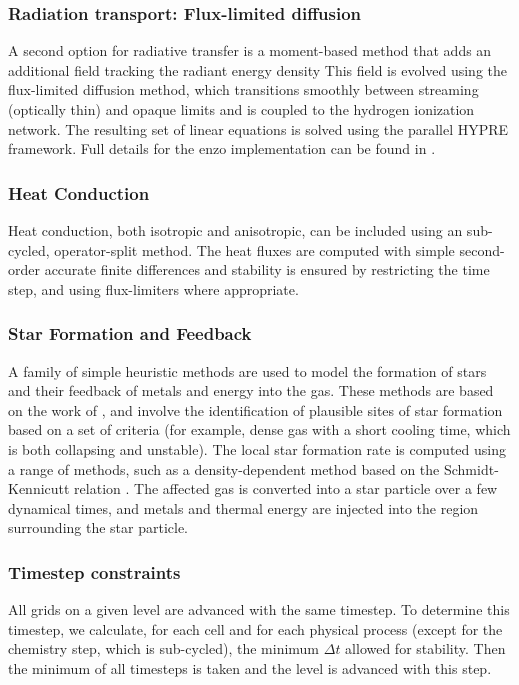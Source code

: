 \subsubsection{Radiation transport: Flux-limited diffusion}

A second option for radiative transfer is a moment-based method that
adds an additional field tracking the radiant energy density
This field is evolved using the flux-limited diffusion method, which
transitions smoothly between streaming (optically thin) and opaque
limits and is coupled to the hydrogen ionization network.  The
resulting set of linear equations is solved using the parallel HYPRE
framework.  Full details for the enzo implementation can be found in
\citet{ReynoldsHayesPaschosNorman2009}.

\subsubsection{Heat Conduction}

Heat conduction, both isotropic and anisotropic, can be included using
an sub-cycled, operator-split method.  The heat fluxes are computed
with simple second-order accurate finite differences and stability is
ensured by restricting the time step, and using flux-limiters where
appropriate.

\subsubsection{Star Formation and Feedback}

A family of simple heuristic methods are used to model the formation
of stars and their feedback of metals and energy into the gas.  These
methods are based on the work of \citet{CO1992}, and involve the
identification of plausible sites of star formation based on a set of
criteria (for example, dense gas with a short cooling time, which is
both collapsing and unstable).  The local star formation rate is
computed using a range of methods, such as a density-dependent method
based on the Schmidt-Kennicutt relation \citep{K89}.  The affected gas
is converted into a star particle over a few dynamical times, and
metals and thermal energy are injected into the region surrounding the
star particle.

\subsubsection{Timestep constraints}

All grids on a given level are advanced with the same timestep.  To
determine this timestep, we calculate, for each cell and for each
physical process (except for the chemistry step, which is sub-cycled),
the minimum $\Delta t$ allowed for stability.  Then the minimum of all
timesteps is taken and the level is advanced with this step.

